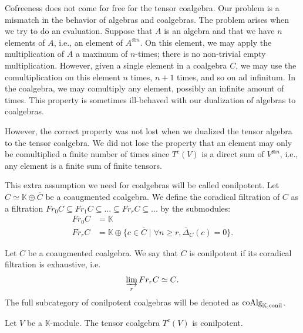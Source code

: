 \documentclass[../thesis.tex]{subfiles}
\begin{document}
            Cofreeness does not come for free for the tensor coalgebra. Our problem is a mismatch in the behavior of algebras and coalgebras. The problem arises when we try to do an evaluation. Suppose that $A$ is an algebra and that we have $n$ elements of $A$, i.e., an element of $A^{\otimes n}$. On this element, we may apply the multiplication of $A$ a maximum of $n$-times; there is no non-trivial empty multiplication. However, given a single element in a coalgebra $C$, we may use the comultiplication on this element $n$ times, $n+1$ times, and so on ad infinitum. In the coalgebra, we may comultiply any element, possibly an infinite amount of times. This property is sometimes ill-behaved with our dualization of algebras to coalgebras. 
            
            However, the correct property was not lost when we dualized the tensor algebra to the tensor coalgebra. We did not lose the property that an element may only be comultiplied a finite number of times since $T^c(V)$ is a direct sum of $V^{\otimes n}$, i.e., any element is a finite sum of finite tensors.
            
            This extra assumption we need for coalgebras will be called conilpotent. Let $C \simeq \mathbb{K} \oplus \overline{C}$ be a coaugmented coalgebra. We define the coradical filtration of $C$ as a filtration $Fr_0C \subseteq Fr_1C \subseteq ... \subseteq Fr_rC \subseteq ...$ by the submodules:
            \begin{align*}
                Fr_0C & = \mathbb{K} \\
                Fr_rC & = \mathbb{K} \oplus \{c\in\overline{C}\mid \forall n\geq r, \overline{\Delta}_C(c) = 0\}.
            \end{align*}

            \begin{definition}
                Let $C$ be a coaugmented coalgebra. We say that $C$ is conilpotent if its coradical filtration is exhaustive, i.e.
                \begin{align*}
                    \varinjlim_rFr_rC \simeq C\tt{.}
                \end{align*}
                The full subcategory of conilpotent coalgebras will be denoted as $\tt{coAlg}_{\mathbb{K},\tt{conil}}$.
            \end{definition}
            
            \begin{proposition}\label{prop: conilpotent-tensor}
                Let $V$ be a $\mathbb{K}$-module. The tensor coalgebra $T^c(V)$ is conilpotent.
            \end{proposition}
\end{document}
